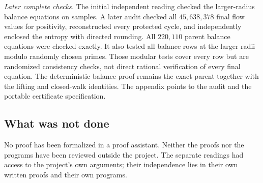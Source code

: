 \emph{Later complete checks.} The initial independent reading checked the larger-radius balance equations on
samples. A later audit checked all $45{,}638{,}378$ final flow values for positivity, reconstructed every protected
cycle, and independently enclosed the entropy with directed rounding. All $220{,}110$ parent balance equations were
checked exactly. It also tested all balance rows at the larger radii modulo randomly chosen primes. Those modular
tests cover every row but are randomized consistency checks, not direct rational verification of every final equation.
The deterministic balance proof remains the exact parent together with the lifting and closed-walk identities.
The appendix points to the audit and the portable certificate specification.

\subsection{What was not done}

No proof has been formalized in a proof assistant. Neither the proofs nor the programs have been reviewed outside the
project. The separate readings had access to the project's own arguments; their independence lies in their own written
proofs and their own programs.
